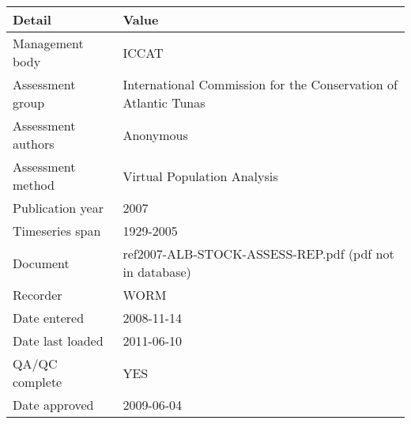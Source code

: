 \begin{table}[htb]
\centering
\begin{tabular}{lp{7cm}}
\toprule
Detail & Value \\
\midrule
Management body    & ICCAT                                                           \\
Assessment group   & International Commission for the Conservation of Atlantic Tunas \\
Assessment authors & {Anonymous}                                                     \\
Assessment method  & Virtual Population Analysis                                     \\
Publication year   & 2007                                                            \\
Timeseries span    & 1929-2005                                                       \\
Document           & ref2007-ALB-STOCK-ASSESS-REP.pdf (pdf not in database)          \\
Recorder           & WORM                                                            \\
Date entered       & 2008-11-14                                                      \\
Date last loaded   & 2011-06-10                                                      \\
QA/QC complete     & YES                                                             \\
Date approved      & 2009-06-04                                                      \\
\bottomrule
\end{tabular}
\label{tab:assessdet}
\end{table}
